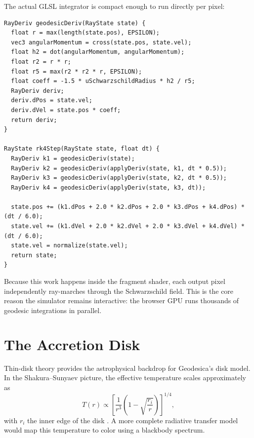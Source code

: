 \documentclass[12pt]{article}
\begin{document}
The actual GLSL integrator is compact enough to run directly per pixel:

\begin{lstlisting}
RayDeriv geodesicDeriv(RayState state) {
  float r = max(length(state.pos), EPSILON);
  vec3 angularMomentum = cross(state.pos, state.vel);
  float h2 = dot(angularMomentum, angularMomentum);
  float r2 = r * r;
  float r5 = max(r2 * r2 * r, EPSILON);
  float coeff = -1.5 * uSchwarzschildRadius * h2 / r5;
  RayDeriv deriv;
  deriv.dPos = state.vel;
  deriv.dVel = state.pos * coeff;
  return deriv;
}

RayState rk4Step(RayState state, float dt) {
  RayDeriv k1 = geodesicDeriv(state);
  RayDeriv k2 = geodesicDeriv(applyDeriv(state, k1, dt * 0.5));
  RayDeriv k3 = geodesicDeriv(applyDeriv(state, k2, dt * 0.5));
  RayDeriv k4 = geodesicDeriv(applyDeriv(state, k3, dt));

  state.pos += (k1.dPos + 2.0 * k2.dPos + 2.0 * k3.dPos + k4.dPos) * (dt / 6.0);
  state.vel += (k1.dVel + 2.0 * k2.dVel + 2.0 * k3.dVel + k4.dVel) * (dt / 6.0);
  state.vel = normalize(state.vel);
  return state;
}
\end{lstlisting}

Because this work happens inside the fragment shader, each output pixel independently ray-marches through the Schwarzschild field. This is the core reason the simulator remains interactive: the browser GPU runs thousands of geodesic integrations in parallel.

\section{The Accretion Disk}
Thin-disk theory provides the astrophysical backdrop for Geodesica's disk model. In the Shakura--Sunyaev picture, the effective temperature scales approximately as
\begin{equation}
T(r) \propto \left[\frac{1}{r^3}\left(1 - \sqrt{\frac{r_i}{r}}\right)\right]^{1/4},
\label{eq:thin_disk_temperature}
\end{equation}
with $r_i$ the inner edge of the disk \cite{shakura1973}. A more complete radiative transfer model would map this temperature to color using a blackbody spectrum.
\end{document}
